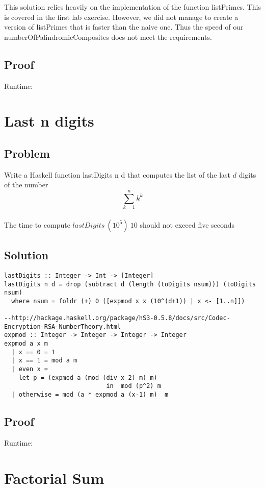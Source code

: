 \documentclass[a4paper,11pt]{article}
\begin{document}
This solution relies heavily on the implementation of the function listPrimes. This is covered in the first lab exercise. However, we did not manage to create a version of listPrimes that is faster than the naive one. Thus the speed of our numberOfPalindromicComposites does not meet the requirements.

\subsection{Proof}
Runtime:

\section{Last n digits}
\subsection{Problem}
Write a Haskell function lastDigits n d that computes the list of the last $d$ digits of the number
\begin{equation}
\sum\limits_{k=1}^n k^k
\end{equation}
\\
The time to compute $lastDigits\: (10^5)\: 10$ should not exceed five seconds

\subsection{Solution}

\begin{lstlisting}
lastDigits :: Integer -> Int -> [Integer]
lastDigits n d = drop (subtract d (length (toDigits nsum))) (toDigits nsum)
  where nsum = foldr (+) 0 ([expmod x x (10^(d+1)) | x <- [1..n]])

--http://hackage.haskell.org/package/hS3-0.5.8/docs/src/Codec-Encryption-RSA-NumberTheory.html
expmod :: Integer -> Integer -> Integer -> Integer
expmod a x m
  | x == 0 = 1
  | x == 1 = mod a m
  | even x =
    let p = (expmod a (mod (div x 2) m) m)
                            in  mod (p^2) m
  | otherwise = mod (a * expmod a (x-1) m)  m 
\end{lstlisting}

\subsection{Proof}
Runtime:

\section{Factorial Sum}
\end{document}
